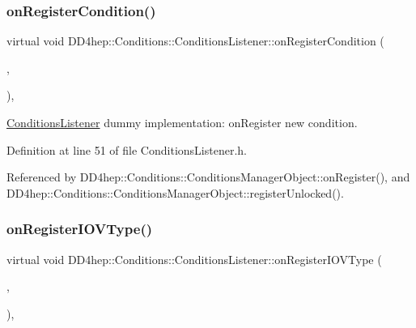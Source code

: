 \subsubsection{\texorpdfstring{on\+Register\+Condition()}{onRegisterCondition()}}
{\footnotesize\ttfamily virtual void D\+D4hep\+::\+Conditions\+::\+Conditions\+Listener\+::on\+Register\+Condition (\begin{DoxyParamCaption}\item[{\hyperlink{class_d_d4hep_1_1_conditions_1_1_condition}{Condition}}]{,  }\item[{void $\ast$}]{ }\end{DoxyParamCaption})\hspace{0.3cm}{\ttfamily [inline]}, {\ttfamily [virtual]}}



\hyperlink{class_d_d4hep_1_1_conditions_1_1_conditions_listener}{Conditions\+Listener} dummy implementation\+: on\+Register new condition. 



Definition at line 51 of file Conditions\+Listener.\+h.



Referenced by D\+D4hep\+::\+Conditions\+::\+Conditions\+Manager\+Object\+::on\+Register(), and D\+D4hep\+::\+Conditions\+::\+Conditions\+Manager\+Object\+::register\+Unlocked().

\hypertarget{class_d_d4hep_1_1_conditions_1_1_conditions_listener_a8757616579713cf0101d5c6b68460f9d}{}\label{class_d_d4hep_1_1_conditions_1_1_conditions_listener_a8757616579713cf0101d5c6b68460f9d} 
\subsubsection{\texorpdfstring{on\+Register\+I\+O\+V\+Type()}{onRegisterIOVType()}}
{\footnotesize\ttfamily virtual void D\+D4hep\+::\+Conditions\+::\+Conditions\+Listener\+::on\+Register\+I\+O\+V\+Type (\begin{DoxyParamCaption}\item[{const \hyperlink{class_d_d4hep_1_1_i_o_v_type}{I\+O\+V\+Type} $\ast$}]{,  }\item[{void $\ast$}]{ }\end{DoxyParamCaption})\hspace{0.3cm}{\ttfamily [inline]}, {\ttfamily [virtual]}}



